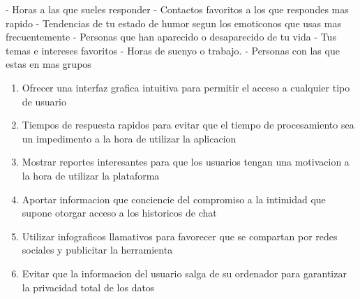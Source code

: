 - Horas a las que sueles responder
- Contactos favoritos a los que respondes mas rapido
- Tendencias de tu estado de humor segun los emoticonos que usas mas frecuentemente
- Personas que han aparecido o desaparecido de tu vida
- Tus temas e intereses favoritos
- Horas de suenyo o trabajo.
- Personas con las que estas en mas grupos
\begin{enumerate}
    \item Ofrecer una interfaz grafica intuitiva para permitir el acceso a cualquier tipo de usuario
    \item Tiempos de respuesta rapidos para evitar que el tiempo de procesamiento sea un impedimento a la hora de utilizar la aplicacion
    \item Mostrar reportes interesantes para que los usuarios tengan una motivacion a la hora de utilizar la plataforma
    \item Aportar informacion que conciencie del compromiso a la intimidad que supone otorgar acceso a los historicos de chat
    \item Utilizar infograficos llamativos para favorecer que se compartan por redes sociales y publicitar la herramienta
    \item Evitar que la informacion del usuario salga de su ordenador para garantizar la privacidad total de los datos
\end{enumerate}
